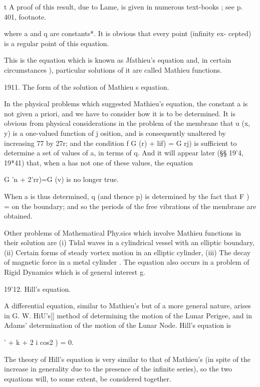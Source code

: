 t A proof of this result, due to Lame, is given in numerous text-books
; see p. 401, footnote.

%
%

where a and q are constants*. It is obvious that every point (infinity
ex- cepted) is a regular point of this equation.

This is the equation which is known as Jfathieu's equation and, in
certain circumstances ), particular solutions of it are called
Mathieu functions.

1911. The form of the solution of Mathieu s equation.

In the physical problems which suggested Mathieu's equation, the
constant a is not given a priori, and we have to consider how it is to
be determined. It is obvious from physical considerations in the
problem of the membrane that u (x, y) is a one-valued function of j
osition, and is consequently unaltered by increasing 77 by 27r; and
the condition f G (r) + lif) = G rj) is sufficient to determine a set
of values of a, in terms of q. And it will appear later (§§ 19'4,
19*41) that, when a has not one of these values, the equation

G 'n + 2'rr)=G (v) is no longer true.

When a is thus determined, q (and thence p) is determined by the fact
that F ) = on the boundary; and so the periods of the free vibrations
of the membrane are obtained.

Other problems of Mathematical Phy.sics which involve Mathieu
functions in their solution are (i) Tidal waves in a cylindrical
vessel with an elliptic boundary, (ii) Certain forms of steady vortex
motion in an elliptic cylinder, (iii) The decay of magnetic force in a
metal cylinder . The equation also occurs in a problem of Rigid
Dynamics which is of general interest g.

19'12. Hill's equation.

A differential equation, similar to Mathieu's but of a more general
nature, arises in G. W. HiU's]] method of determining the motion of
the Lunar Perigee, and in Adams' determination of the motion of the
Lunar Node. Hill's equation is

 ' + k + 2 i cos2 ) = 0.

The theory of Hill's equation is very similar to that of Mathieu's (in
spite of the increase in generality due to the presence of the
infinite series), so the two equations will, to some extent, be
considered together.

